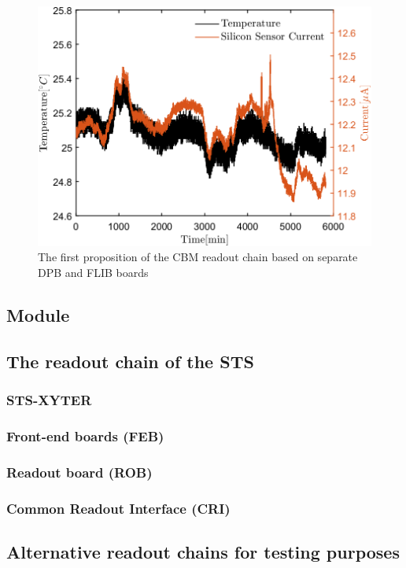 \begin{figure}[!h]
\centering
\includegraphics[width=0.65\columnwidth]{Chapter2/images/currenttempnobeam.png}
\caption{The first proposition of the CBM readout chain based on separate DPB and FLIB boards \cite{CRI}}
\label{fig_leakage1}
\end{figure}



\subsection{Module}
\label{module}
\subsection{The readout chain of the STS}
\label{readout}
\label{DAQ}
\subsubsection{STS-XYTER}

\subsubsection{Front-end boards (FEB)}

\subsubsection{Readout board (ROB)}

\subsubsection{Common Readout Interface (CRI)}
\subsection{Alternative readout chains for testing purposes}

